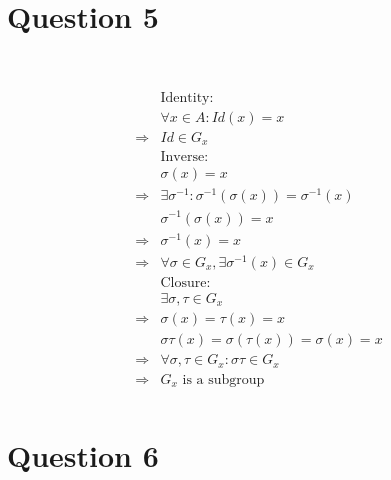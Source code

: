 \documentclass{article}
\begin{document}
\newpage

\section*{Question 5}

~

\begin{equation*}
    \begin{split}
        &\text{Identity}:\\
        &\forall x\in A:Id(x)=x\\
        \Rightarrow&Id\in G_x\\
        &\text{Inverse}:\\
        &\sigma(x)=x\\
        \Rightarrow&\exists\sigma^{-1}:\sigma^{-1}(\sigma(x))=\sigma^{-1}(x)\\
        &\sigma^{-1}(\sigma(x))=x\\
        \Rightarrow&\sigma^{-1}(x)=x\\
        \Rightarrow&\forall \sigma\in G_x,\exists\sigma^{-1}(x)\in G_x\\
        &\text{Closure}:\\
        &\exists \sigma,\tau\in G_x\\
        \Rightarrow&\sigma(x)=\tau(x)=x\\
        &\sigma\tau(x)=\sigma(\tau(x))=\sigma(x)=x\\
        \Rightarrow&\forall \sigma,\tau\in G_x:\sigma\tau\in G_x\\
        \Rightarrow&G_x\text{ is a subgroup}\\
    \end{split}
\end{equation*}

\newpage

\section*{Question 6}

~
\end{document}

